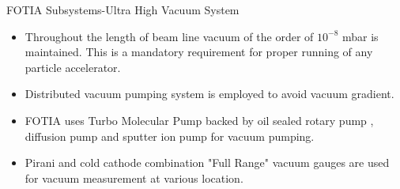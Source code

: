 \documentclass[11pt]{beamer}
\begin{document}
\begin{frame}{FOTIA Subsystems-Ultra High Vacuum System}

  \begin{itemize}
      
    \item Throughout the length of beam line vacuum of the order of $10^{-8}$ mbar is maintained. This is a mandatory requirement for proper running of any particle accelerator.
    \item Distributed vacuum pumping system is employed to avoid vacuum gradient. 
    \item FOTIA uses Turbo Molecular Pump backed by oil sealed rotary pump , diffusion pump and sputter ion pump for vacuum pumping.
    \item Pirani and cold cathode combination "Full Range" vacuum gauges are used for vacuum measurement at various location.
           
   \end{itemize}

\end{frame}
\end{document}
